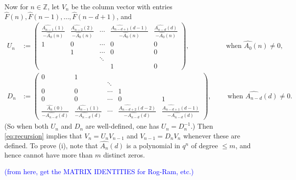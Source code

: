 \documentclass[reqno,11pt]{amsart}
\theoremstyle{definition}
\theoremstyle{remark}
\numberwithin{equation}{section}
\newcommand{\Z}{\mathbb{Z}}
\renewcommand{\hat}{\widehat}
\newcommand{\fix}[1]{\textcolor{blue}{\large (#1)\normalsize}}
\begin{document}
Now for $n \in \Z$, let $V_n$ be the column vector with entries $\hat{F}(n), \hat{F}(n-1), \ldots, \hat{F}(n-d+1)$, and 
\[
\begin{aligned}
    U_n &:= \begin{pmatrix}
    \frac{\hat{A_{n-1}}(1)}{-\hat{A_0}(n)} & 
    \frac{\hat{A_{n-2}}(2)}{-\hat{A_0}(n)} & \cdots & 
    \frac{\hat{A_{n-d+1}}(d-1)}{-\hat{A_0}(n)} & 
    \frac{\hat{A_{n-d}}(d)}{-\hat{A_0}(n)} \\
    1 & 0 & \cdots & 0 & 0\\
     & 1 & \cdots & 0 & 0 \\
    & & \ddots \\
    & & & 1 & 0
    \end{pmatrix}, \qquad \qquad \quad   \text{ when }\hat{A_0}(n) \neq 0,
    \\ 
    D_n &:= 
    \begin{pmatrix}
    0 & 1 \\
    & &  \ddots \\
    0 & 0 & \cdots & 1 \\ 
    0 & 0 & \cdots & 0 & 1 \\
    \frac{\hat{A_{n}}(0)}{-\hat{A_{n-d}}(d)} & 
    \frac{\hat{A_{n-1}}(1)}{-\hat{A_{n-d}}(d)} & \cdots & 
    \frac{\hat{A_{n-d+2}}(d-2)}{-\hat{A_{n-d}}(d)} & 
    \frac{\hat{A_{n-d+1}}(d-1)}{-\hat{A_{n-d}}(d)}
    \end{pmatrix}, \qquad \text{ when }\hat{A_{n-d}}(d) \neq 0.
\end{aligned}
\]
(So when both $U_n$ and $D_n$ are well-defined, one has $U_n = D_n^{-1}$.) Then \cref{eq:recursion} implies that $V_n = U_n V_{n-1}$ and $V_{n-1} = D_n V_n$ whenever these are defined. To prove (i), note that $\hat{A_n}(d)$ is a polynomial in $q^n$ of degree $\le m$, and hence cannot have more than $m$ distinct zeros. 


\fix{from here, get the MATRIX IDENTITIES for Rog-Ram, etc.}
\fi
\end{document}
